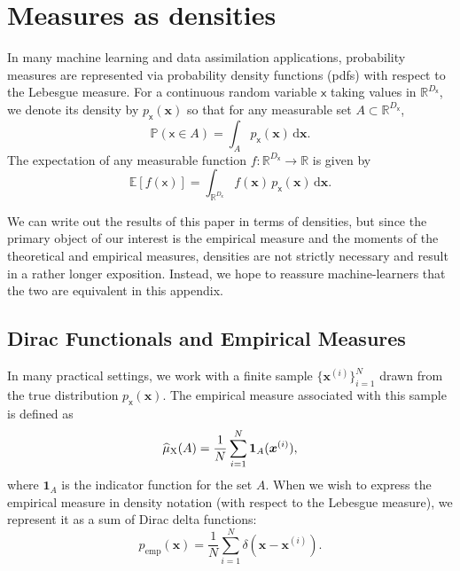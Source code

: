 \documentclass[wcp]{jmlr} %
\newcommand{\Ex}{\mathbb{E}}
\newcommand{\vv}[1]{\boldsymbol{#1}}
\newcommand{\mm}[1]{\mathrm{#1}}
\newcommand{\rv}[1]{\mathsf{#1}}
\newcommand{\vrv}[1]{\vv{\rv{#1}}}
\renewcommand{\Pr}{\mathbb{P}}
\begin{document}
\appendix

\section{Measures as densities}\label{sec:densities-please}

In many machine learning and data assimilation applications, probability measures are represented via probability density functions (pdfs) with respect to the Lebesgue measure. For a continuous random variable \(\vrv{x}\) taking values in \(\mathbb{R}^{D_{\vrv{x}}}\), we denote its density by \(p_{\vrv{x}}(\vv{x})\) so that for any measurable set \(A \subset \mathbb{R}^{D_{\vrv{x}}}\),
\begin{equation}
    \Pr\left(\vrv{x} \in A\right)
    = \int_A p_{\vrv{x}}(\vv{x})\,\mathrm{d}\vv{x}.
\end{equation}
The expectation of any measurable function \(f:\mathbb{R}^{D_{\vrv{x}}}\to\mathbb{R}\) is given by
\begin{equation}
    \Ex[f(\vrv{x})] = \int_{\mathbb{R}^{D_{\vrv{x}}}} f(\vv{x})\,p_{\vrv{x}}(\vv{x})\,\mathrm{d}\vv{x}.
\end{equation}

We can write out the results of this paper in terms of densities, but since the primary object of our interest is the empirical measure and the moments of the theoretical and empirical measures, densities are not strictly necessary and result in a rather longer exposition.
Instead, we hope to reassure machine-learners that the two are equivalent in this appendix.

\subsection*{Dirac Functionals and Empirical Measures}

In many practical settings, we work with a finite sample \(\{\vv{x}^{(i)}\}_{i=1}^N\) drawn from the true distribution \(p_{\vrv{x}}(\vv{x})\). The empirical measure associated with this sample is defined as
\begin{equation}
    \ELaw[\mm{X}](A) = \frac{1}{N} \sum_{i=1}^N \mathbf{1}_A(\vv{x}^{(i)}),
\end{equation}
where \(\mathbf{1}_A\) is the indicator function for the set \(A\). When we wish to express the empirical measure in density notation (with respect to the Lebesgue measure), we represent it as a sum of Dirac delta functions:
\begin{equation}
    p_{\text{emp}}(\vv{x}) = \frac{1}{N} \sum_{i=1}^N \delta(\vv{x}-\vv{x}^{(i)}).
\end{equation}
\end{document}
